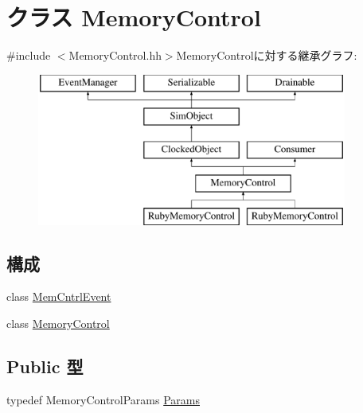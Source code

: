 \hypertarget{classMemoryControl}{
\section{クラス MemoryControl}
\label{classMemoryControl}
}


{\ttfamily \#include $<$MemoryControl.hh$>$}MemoryControlに対する継承グラフ:\begin{figure}[H]
\begin{center}
\leavevmode
\includegraphics[height=5cm]{classMemoryControl}
\end{center}
\end{figure}
\subsection*{構成}
\begin{DoxyCompactItemize}
\item 
class \hyperlink{classMemoryControl_1_1MemCntrlEvent}{MemCntrlEvent}
\item 
class \hyperlink{classMemoryControl_1_1MemoryControl}{MemoryControl}
\end{DoxyCompactItemize}
\subsection*{Public 型}
\begin{DoxyCompactItemize}
\item 
typedef MemoryControlParams \hyperlink{classMemoryControl_aec6d67eaecba2a2311edc4c4c78fb0f5}{Params}
\end{DoxyCompactItemize}
